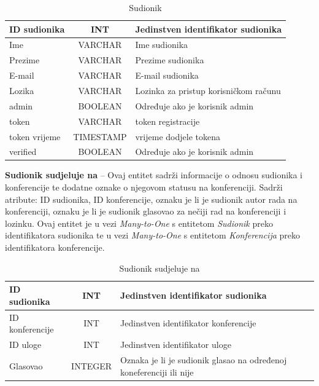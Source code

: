 \begin{table}[H]
	\caption{Sudionik}
	\label{tbl:sudionik}
	\centering
	\begin{tabular}{|l|c|l|} 
		\hline
		\cellcolor{lightgreen}ID sudionika & INT & Jedinstven identifikator sudionika\\ 
		\hline
		Ime & VARCHAR & Ime sudionika\\ 
		\hline
		Prezime & VARCHAR & Prezime sudionika\\ 
		\hline
		E-mail & VARCHAR & E-mail sudionika\\ 
		\hline
		Lozika & VARCHAR & Lozinka za pristup korisničkom računu\\ 
		\hline
		admin & BOOLEAN & Određuje ako je korisnik admin\\ 
		\hline
		token & VARCHAR & token registracije\\ 
		\hline
		token vrijeme & TIMESTAMP & vrijeme dodjele tokena\\ 
		\hline
		verified & BOOLEAN & Određuje ako je korisnik admin\\ 
		\hline
	\end{tabular}
\end{table}

\textbf{Sudionik sudjeluje na} – Ovaj entitet sadrži informacije o odnosu sudionika i konferencije te dodatne oznake o njegovom statusu na konferenciji. Sadrži atribute: ID sudionika, ID konferencije, oznaku je li je sudionik autor rada na konferenciji, oznaku je li je sudionik glasovao za nečiji rad na konferenciji i lozinku. Ovaj entitet je u vezi \textit{Many-to-One} s entitetom \textit{Sudionik} preko identifikatora sudionika te u vezi \textit{Many-to-One} s entitetom \textit{Konferencija} preko identifikatora konferencije.

\begin{table}[H]
	\caption{Sudionik sudjeluje na}
	\label{tbl:sudionikSudjelujeNa}
	\centering
	\begin{tabular}{|l|c|l|} 
		\hline
		\cellcolor{lightblue}ID sudionika & INT & Jedinstven identifikator sudionika\\ 
		\hline
		\cellcolor{lightblue}ID konferencije & INT & Jedinstven identifikator konferencije\\ 
		\hline
		\cellcolor{lightblue}ID uloge & INT & Jedinstven identifikator uloge\\ 
		\hline
		Glasovao & INTEGER & Oznaka je li je sudionik glasao na određenoj koneferenciji ili nije\\ 
		\hline
	\end{tabular}
\end{table}

